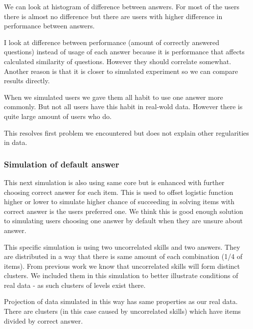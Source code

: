 \documentclass[
  digital, %
  table,   %
  nolof,     %
  nolot,     %
  nocover
]{fithesis3}
\begin{document}
We can look at histogram of difference between answers. For most of the
users there is almost no difference but there are users with higher
difference in performance between answers.


I look at difference between performance (amount of correctly answered
questions) instead of usage of each answer because it is performance
that affects calculated similarity of questions. However they should
correlate somewhat. Another reason is that it is closer to simulated
experiment so we can compare results directly.

When we simulated users we gave them all habit to use one answer more
commonly. But not all users have this habit in real-wold data. However
there is quite large amount of users who do.

This resolves first problem we encountered but does not explain other
regularities in data.

\subsubsection{Simulation of default answer}\label{simulation-of-default-answer}

This next simulation is also using same core but is enhanced with further choosing correct answer for each item. This is used to offset logistic function higher or lower to simulate higher chance of succeeding in solving items with correct answer is the users preferred one. We think this is good enough solution to simulating users choosing one answer by default when they are unsure about answer.

This specific simulation is using two uncorrelated skills and two answers. They are distributed in a way that there is same amount of each combination (1/4 of items). From previous work we know that uncorrelated skills will form distinct clusters. We included them in this simulation to better illustrate conditions of real data - as such clusters of levels exist there.

Projection of data simulated in this way has same properties as our real data. There are clusters (in this case caused by uncorrelated skills) which have items divided by correct answer.

\end{document}
